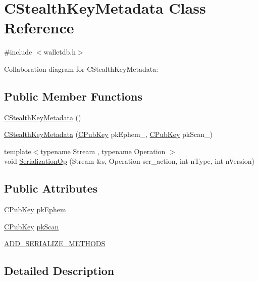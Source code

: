 \hypertarget{class_c_stealth_key_metadata}{}\section{C\+Stealth\+Key\+Metadata Class Reference}
\label{class_c_stealth_key_metadata}


{\ttfamily \#include $<$walletdb.\+h$>$}



Collaboration diagram for C\+Stealth\+Key\+Metadata\+:
\subsection*{Public Member Functions}
\begin{DoxyCompactItemize}
\item 
\hyperlink{class_c_stealth_key_metadata_afaab6f89c2fd3644080e997b5d4b7c42}{C\+Stealth\+Key\+Metadata} ()
\item 
\hyperlink{class_c_stealth_key_metadata_a0dbf3cce45146537ebadc98d04e41a46}{C\+Stealth\+Key\+Metadata} (\hyperlink{class_c_pub_key}{C\+Pub\+Key} pk\+Ephem\+\_\+, \hyperlink{class_c_pub_key}{C\+Pub\+Key} pk\+Scan\+\_\+)
\item 
{\footnotesize template$<$typename Stream , typename Operation $>$ }\\void \hyperlink{class_c_stealth_key_metadata_a4aa4f82e29e709287100972b4790c6c2}{Serialization\+Op} (Stream \&s, Operation ser\+\_\+action, int n\+Type, int n\+Version)
\end{DoxyCompactItemize}
\subsection*{Public Attributes}
\begin{DoxyCompactItemize}
\item 
\hyperlink{class_c_pub_key}{C\+Pub\+Key} \hyperlink{class_c_stealth_key_metadata_a109d244f532a6de7401e71256732da8e}{pk\+Ephem}
\item 
\hyperlink{class_c_pub_key}{C\+Pub\+Key} \hyperlink{class_c_stealth_key_metadata_a0444523e7274793bd69269c08f6925db}{pk\+Scan}
\item 
\hyperlink{class_c_stealth_key_metadata_ae96c692529c691b24d1340802d8e0791}{A\+D\+D\+\_\+\+S\+E\+R\+I\+A\+L\+I\+Z\+E\+\_\+\+M\+E\+T\+H\+O\+D\+S}
\end{DoxyCompactItemize}


\subsection{Detailed Description}



